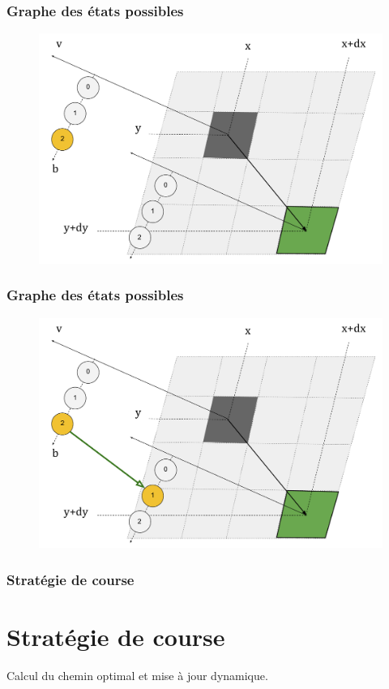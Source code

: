\documentclass[c]{beamer}
\begin{document}
\begin{frame}[label=structures5]
\transdissolve[duration=1]
\frametitle{Graphe des états possibles}
\begin{figure}[!h]
\centering
\includegraphics[scale=0.3]{fig/g005.pdf}
\end{figure}
\end{frame}

\begin{frame}[label=structures5]
\transdissolve[duration=1]
\frametitle{Graphe des états possibles}
\begin{figure}[!h]
\centering
\includegraphics[scale=0.3]{fig/g006.pdf}
\end{figure}
\end{frame}

\begin{frame}[label=strategie]
\transdissolve[duration=1]
\frametitle{Stratégie de course}
\section{Stratégie de course}
Calcul du chemin optimal et mise à jour dynamique.
\end{frame}
\end{document}
